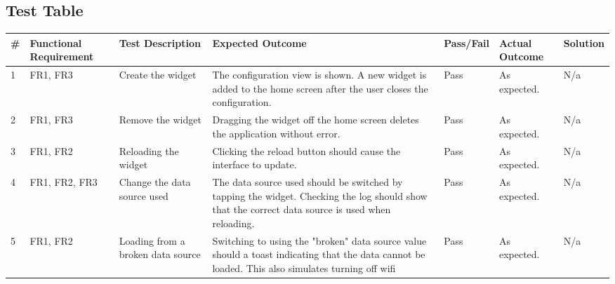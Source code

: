\documentclass[paper=a4, fontsize=11pt]{scrartcl}	%
\numberwithin{equation}{section}															%
\numberwithin{figure}{section}																%
\numberwithin{table}{section}
\begin{document}
\begin{landscape}
\section{Test Table}

\begin{longtable}{|l|p{2cm}|p{5cm}|p{7cm}|l|p{3cm}|p{1.5cm}|}
\hline
\textbf{\#} & \textbf{Functional Requirement} & \textbf{Test Description}                                & \textbf{Expected Outcome}                                                                                                                        & \textbf{Pass/Fail} & \textbf{Actual Outcome} & \textbf{Solution} \\ \hline \hline \endhead
1           & FR1, FR3                        & Create the widget                                        & The configuration view is shown. A new widget is added to the home screen after the user closes the configuration.                               & Pass               & As expected.            & N/a               \\ \hline
2           & FR1, FR3                        & Remove the widget                                        & Dragging the widget off the home screen deletes the application without error.                                                                   & Pass               & As expected.            & N/a               \\ \hline
3           & FR1, FR2                        & Reloading the widget                                     & Clicking the reload button should cause the interface to update.                                                                                 & Pass               & As expected.            & N/a               \\ \hline
4           & FR1, FR2, FR3                   & Change the data source used                              & The data source used should be switched by tapping the widget. Checking the log should show that the correct data source is used when reloading. & Pass               & As expected.            & N/a               \\ \hline
5           & FR1, FR2                        & Loading from a broken data source                        & Switching to using the "broken" data source value should a toast indicating that the data cannot be loaded. This also simulates turning off wifi & Pass               & As expected.            & N/a               \\ \hline

\end{longtable}
\end{landscape}
\end{document}
